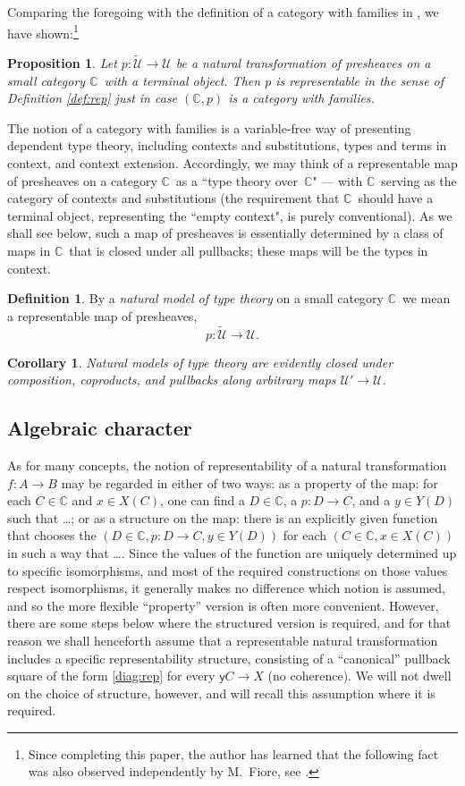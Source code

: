 \documentclass[12pt]{article}
\newcommand{\C}{\ensuremath{\mathbb{C}}}
\newcommand{\y}{\ensuremath{\mathsf{y}}}
\newcommand{\U}{\ensuremath{\mathcal{U}}}
\newcommand{\UU}{\ensuremath{\widetilde{\mathcal{U}}}}
\newtheorem{proposition}[theorem]{Proposition}
\newtheorem{corollary}[theorem]{Corollary}
\theoremstyle{definition}
\newtheorem{definition}[theorem]{Definition}
\begin{document}
Comparing the foregoing with the definition of a category with families  in \cite{CwF}, we have shown:\footnote{
Since completing this paper, the author has learned that the following fact was also observed independently by M.~Fiore, see \cite{fiore}.}

\begin{proposition}
Let $p : \UU\to\U$ be a natural transformation of presheaves on a small category \C\ with a terminal object.  Then $p$ is representable in the sense of Definition \ref{def:rep} just in case $(\C, p)$ is a category with families.
\end{proposition}

The notion of a category with families is a variable-free way of presenting dependent type theory, including contexts and substitutions, types and terms in context, and context extension.  Accordingly, we may think of a representable map of presheaves on a category \C\ as a ``type theory over~\C" --- with  \C\ serving as the category of contexts and substitutions (the requirement that \C\ should have a terminal object, representing the ``empty context", is purely conventional).  As we shall see below, such a map of presheaves is essentially determined by a class of maps in \C\ that is closed under all pullbacks; these maps will be the types in context.

\begin{definition}
By a \emph{natural model of type theory} on a small category \C\ we mean a representable map of presheaves, 
\[
p : \UU \to \U.
\]
\end{definition}

\begin{corollary}
Natural models of type theory are evidently closed under composition, coproducts, and pullbacks along arbitrary maps $\U'\to\U$.
\end{corollary}

\subsection{Algebraic character}\label{subsection:algebraic}
As for many concepts, the notion of representability of a natural transformation $f : A \to B$ may be regarded in either of two ways: as a property of the map: for each $C\in\C$ and $x\in X(C)$, one can find a $D\in\C$, a $p : D\to C$, and a $y\in Y(D)$ such that \dots; or as a structure on the map: there is an explicitly given function that chooses the $(D\in\C, p : D\to C,y\in Y(D))$ for each $(C\in\C, x\in X(C))$ in such a way that \dots.  Since the values of the function are uniquely determined up to specific isomorphisms, and most of the required constructions on those values respect isomorphisms, it generally makes no difference which notion is assumed, and so the more flexible ``property'' version is often more convenient.  However, there are some steps below where the structured version is required, and for that reason we shall henceforth assume that a representable natural transformation includes a specific representability structure, consisting of a ``canonical'' pullback square of the form \eqref{diag:rep} for every $\y{C}\to X$ (no coherence).  We will not dwell on the choice of structure, however, and will recall this assumption where it is required.
\end{document}
